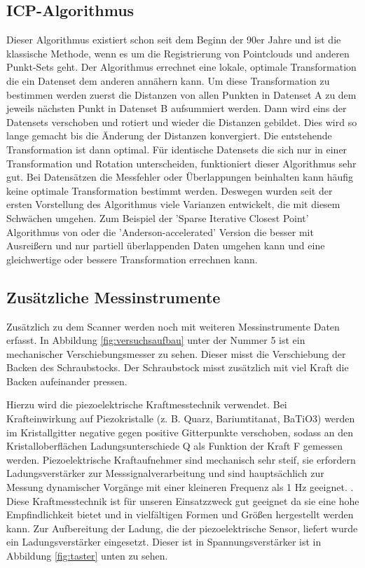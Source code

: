 \documentclass[../main.tex]{subfiles}
\begin{document}
\subsection{ICP-Algorithmus}

Dieser Algorithmus existiert schon seit dem Beginn der 90er Jahre und ist 
die klassische Methode, wenn es um die Registrierung von Pointclouds und 
anderen Punkt-Sets geht. \cite[]{icp}
Der Algorithmus errechnet eine lokale, optimale Transformation die ein Datenset
dem anderen annähern kann. \cite{icp_og}
Um diese Transformation zu bestimmen werden zuerst die Distanzen von allen 
Punkten in Datenset A zu dem jeweils nächsten Punkt in Datenset B aufsummiert 
werden. Dann wird eins der Datensets verschoben und rotiert und wieder die 
Distanzen gebildet. Dies wird so lange gemacht bis die Änderung der Distanzen 
konvergiert. Die entstehende Transformation ist dann optimal.
Für identische Datensets die sich nur in einer Transformation und Rotation 
unterscheiden, funktioniert dieser Algorithmus sehr gut. Bei Datensätzen die 
Messfehler oder Überlappungen beinhalten kann häufig keine optimale 
Transformation bestimmt werden.
Deswegen wurden seit der ersten Vorstellung des Algorithmus viele Varianzen
entwickelt, die mit diesem Schwächen umgehen. 
Zum Beispiel der 'Sparse Iterative Closest Point' Algorithmus von \cite{Bouaziz.2013}
oder die 'Anderson-accelerated' Version die besser mit Ausreißern und nur 
partiell überlappenden Daten umgehen kann und eine gleichwertige oder bessere 
Transformation errechnen kann. \cite{icp}

\subsection{Zusätzliche Messinstrumente}

Zusätzlich zu dem Scanner werden noch mit weiteren Messinstrumente Daten erfasst.
In Abbildung \ref{fig:versuchsaufbau} unter der Nummer 5 ist ein mechanischer 
Verschiebungsmesser zu sehen. Dieser misst die Verschiebung der Backen des 
Schraubstocks. Der Schraubstock misst zusätzlich mit viel Kraft die Backen 
aufeinander pressen.

Hierzu wird die piezoelektrische Kraftmesstechnik verwendet.
Bei Krafteinwirkung auf Piezokristalle (z. B. Quarz, Bariumtitanat, BaTiO3) 
werden im Kristallgitter negative gegen positive Gitterpunkte
verschoben, sodass an den Kristalloberflächen
Ladungsunterschiede Q als Funktion der Kraft F
gemessen werden.
Piezoelektrische Kraftaufnehmer sind mechanisch sehr steif, 
sie erfordern Ladungsverstärker
zur Messsignalverarbeitung und sind hauptsächlich zur Messung dynamischer Vorgänge
mit einer kleineren Frequenz als 1 Hz geeignet. \cite{Czichos.2020}. 
Diese Kraftmesstechnik ist 
für unseren Einsatzzweck gut geeignet da sie eine hohe Empfindlichkeit bietet 
und in vielfältigen Formen und Größen hergestellt werden kann. Zur Aufbereitung 
der Ladung, die der piezoelektrische Sensor, liefert wurde ein Ladungsverstärker 
eingesetzt.\cite{Schwartz.2006}
Dieser ist in Spannungsverstärker ist in Abbildung \ref{fig:taster} unten zu sehen.
\end{document}
